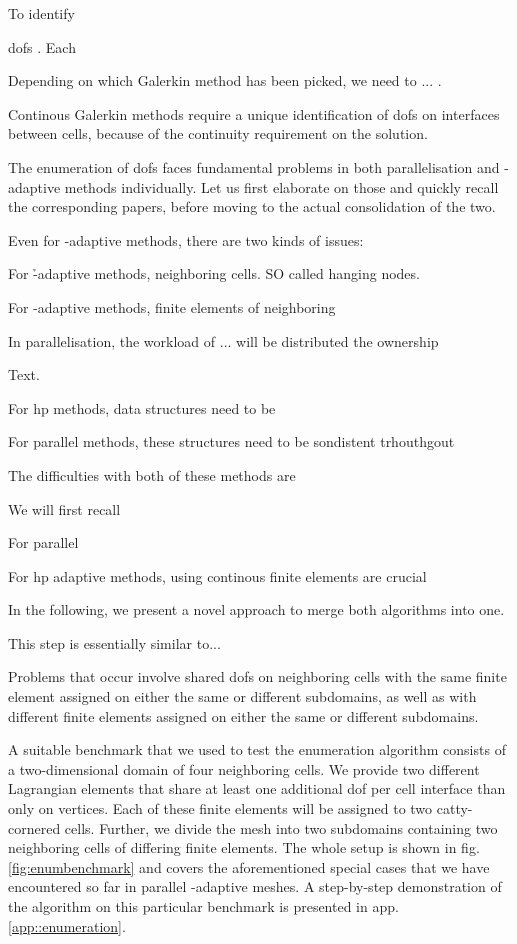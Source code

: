 To identify 

\glspl{dof} . Each

Depending on which Galerkin method has been picked, we need to ... .

Continous Galerkin methods require a unique identification of \glspl{dof} on interfaces between cells, because of the continuity requirement on the solution.




The enumeration of dofs faces fundamental problems in both parallelisation and \hp-adaptive methods individually. Let us first elaborate on those and quickly recall the corresponding papers, before moving to the actual consolidation of the two.

Even for \hp-adaptive methods, there are two kinds of issues:

For \h-adaptive methods, neighboring cells. SO called hanging nodes.

For \p-adaptive methods, finite elements of neighboring 

In parallelisation, the workload of ... will be distributed the ownership




Text.


For hp methods, data structures need to be 

For parallel methods, these structures need to be sondistent trhouthgout

The difficulties with both of these methods are

We will first recall

For parallel


For hp adaptive methods, using continous finite elements are crucial

In the following, we present a novel approach to merge both algorithms into one.



This step is essentially similar to...


Problems that occur involve shared \glspl{dof} on neighboring cells with the same finite element assigned on either the same or different subdomains, as well as with different finite elements assigned on either the same or different subdomains.

A suitable benchmark that we used to test the enumeration algorithm consists of a two-dimensional domain of four neighboring cells. We provide two different Lagrangian elements that share at least one additional \gls{dof} per cell interface than only on vertices. Each of these finite elements will be assigned to two catty-cornered cells. Further, we divide the mesh into two subdomains containing two neighboring cells of differing finite elements. The whole setup is shown in fig.\@ \ref{fig:enumbenchmark} and covers the aforementioned special cases that we have encountered so far in parallel \hp-adaptive meshes. A step-by-step demonstration of the algorithm on this particular benchmark is presented in app.\@ \ref{app::enumeration}.

